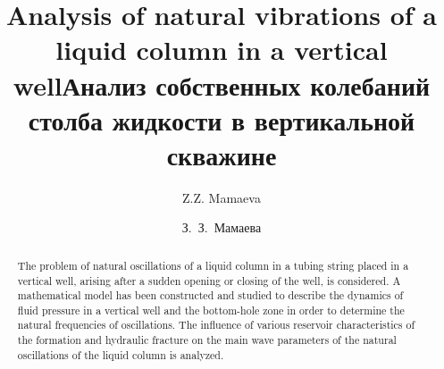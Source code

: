 \begin{englishtitle} %
\title{Analysis of natural vibrations of a liquid column in a vertical well}
\author{Z.Z. Mamaeva
}

\maketitle

\begin{abstract}
The problem of natural oscillations of a liquid column in a tubing string placed in a vertical well, arising after a sudden opening or closing of the well, is considered. A mathematical model has been constructed and studied to describe the dynamics of fluid pressure in a vertical well and the bottom-hole zone in order to determine the natural frequencies of oscillations. The influence of various reservoir characteristics of the formation and hydraulic fracture on the main wave parameters of the natural oscillations of the liquid column is analyzed.

\end{abstract}
\end{englishtitle}

\iffalse
\documentclass[12pt]{llncs}


\usepackage{iftex}

\ifPDFTeX
\usepackage[T2A]{fontenc}
\usepackage[utf8]{inputenc} %
\usepackage[english,russian]{babel}
\fi

\usepackage{todonotes}

\usepackage[russian]{nla}



\fi

\title{Анализ собственных колебаний столба жидкости в вертикальной скважине}
\author{З.~З.~Мамаева}  %
 



